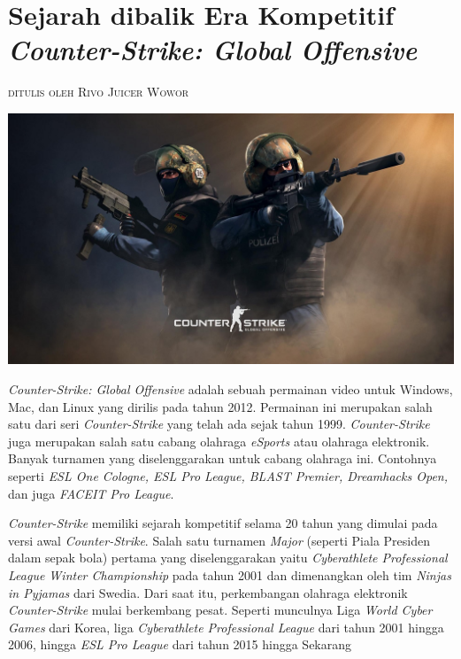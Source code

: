 \documentclass[12pt]{article}
\makeatletter
\newcommand{\chapterauthor}[1]{%
  {\parindent0pt\vspace*{-10pt}%
  \linespread{1.1}\small\scshape#1%
  \par\nobreak\vspace*{10pt}}
  \@afterheading%
}
\makeatother
\begin{document}
    \section*{Sejarah dibalik Era Kompetitif \emph{Counter-Strike: Global Offensive}}
    \chapterauthor{ditulis oleh Rivo Juicer Wowor}
    
    \includegraphics[width=1.0\textwidth]{images/csgo-1.jpg}
    \vspace{1pt}

    \emph{Counter-Strike: Global Offensive} adalah sebuah permainan video
    untuk Windows, Mac, dan Linux yang dirilis pada tahun 2012. Permainan
    ini merupakan salah satu dari seri \emph{Counter-Strike} yang telah ada
    sejak tahun 1999. \emph{Counter-Strike} juga merupakan salah satu cabang
    olahraga \emph{eSports} atau olahraga elektronik. Banyak turnamen yang
    diselenggarakan untuk cabang olahraga ini. Contohnya seperti \emph{ESL
    One Cologne, ESL Pro League, BLAST Premier, Dreamhacks Open,} dan juga
    \emph{FACEIT Pro League}.

    \emph{Counter-Strike} memiliki sejarah kompetitif selama 20 tahun yang
    dimulai pada versi awal \emph{Counter-Strike}. Salah satu turnamen
    \emph{Major} (seperti Piala Presiden dalam sepak bola) pertama yang
    diselenggarakan yaitu \emph{Cyberathlete Professional League Winter
    Championship} pada tahun 2001 dan dimenangkan oleh tim \emph{Ninjas in
    Pyjamas} dari Swedia. Dari saat itu, perkembangan olahraga elektronik
    \emph{Counter-Strike} mulai berkembang pesat. Seperti munculnya Liga
    \emph{World Cyber Games} dari Korea, liga \emph{Cyberathlete
    Professional League} dari tahun 2001 hingga 2006, hingga \emph{ESL Pro
    League} dari tahun 2015 hingga Sekarang
\end{document}
